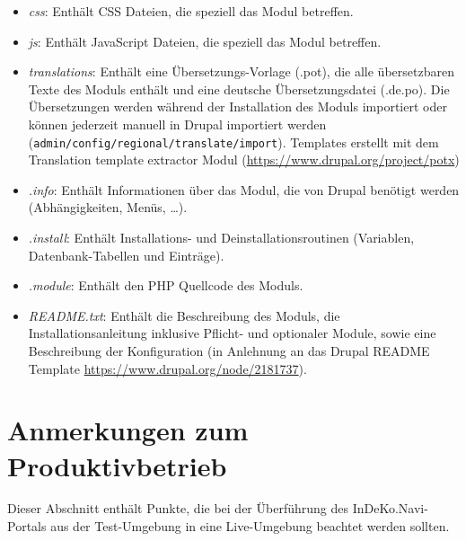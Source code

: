 \begin{itemize}
	\item \textit{css}: Enthält CSS Dateien, die speziell das Modul betreffen.

	\item \textit{js}: Enthält JavaScript Dateien, die speziell das Modul betreffen.

	\item \textit{translations}: Enthält eine Übersetzungs-Vorlage (.pot), die alle übersetzbaren Texte des Moduls enthält und eine deutsche Übersetzungsdatei (.de.po). Die Übersetzungen werden während der Installation des Moduls importiert oder können jederzeit manuell in Drupal importiert werden (\lstinline|admin/config/regional/translate/import|). Templates erstellt mit dem Translation template extractor Modul (\url{https://www.drupal.org/project/potx})

	\item \textit{.info}: Enthält Informationen über das Modul, die von Drupal benötigt werden (Abhängigkeiten, Menüs, \dots).

	\item \textit{.install}: Enthält Installations- und Deinstallationsroutinen (Variablen, Datenbank-Tabellen und Einträge).

	\item \textit{.module}: Enthält den PHP Quellcode des Moduls.

	\item \textit{README.txt}: Enthält die Beschreibung des Moduls, die Installationsanleitung inklusive Pflicht- und optionaler Module, sowie eine Beschreibung der Konfiguration (in Anlehnung an das Drupal README Template \url{https://www.drupal.org/node/2181737}).
\end{itemize}




\section{Anmerkungen zum Produktivbetrieb}\label{sec:live}
Dieser Abschnitt enthält Punkte, die bei der Überführung des InDeKo.Navi-Portals aus der Test-Umgebung in eine Live-Umgebung beachtet werden sollten.

